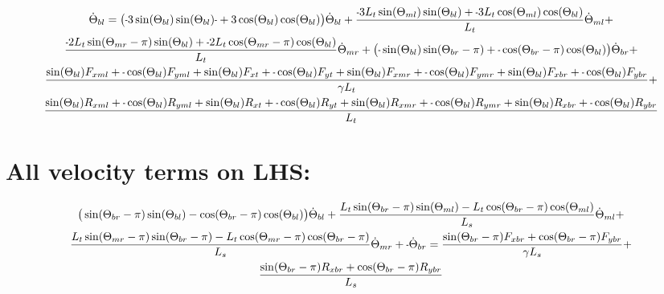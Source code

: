 \documentclass[11pt, landscape]{article}
\newcommand{\mn}{\scalebox{0.7}[1.0]{-}}
\begin{document}
\begin{multline}
\dot{\Theta}_{bl} =
\big(\mn 3\sin(\Theta_{bl})\sin(\Theta_{bl})\mn + 3\cos(\Theta_{bl})\cos(\Theta_{bl}) \big)\dot{\Theta}_{bl} +
\frac{\mn 3L_{t}\sin(\Theta_{ml})\sin(\Theta_{bl}) + \mn 3L_{t}\cos(\Theta_{ml})\cos(\Theta_{bl})}{L_t}\dot{\Theta}_{ml} + \\
\frac{\mn 2L_{t}\sin(\Theta_{mr}-\pi)\sin(\Theta_{bl}) + \mn 2L_{t}\cos(\Theta_{mr}-\pi)\cos(\Theta_{bl})}{L_t}\dot{\Theta}_{mr} +
\big(\mn \sin(\Theta_{bl}) \sin(\Theta_{br}-\pi) + \mn \cos(\Theta_{br}-\pi)\cos(\Theta_{bl})\big) \dot{\Theta}_{br} + \\
\frac{\sin(\Theta_{bl})F_{xml} + \mn\cos(\Theta_{bl})F_{yml} + \sin(\Theta_{bl})F_{xt } + \mn \cos(\Theta_{bl})F_{yt } + \sin(\Theta_{bl})F_{xmr} + \mn \cos(\Theta_{bl})F_{ymr} + \sin(\Theta_{bl})F_{xbr} + \mn \cos(\Theta_{bl})F_{ybr}}{\gamma L_t} + \\
\frac{\sin(\Theta_{bl})R_{xml} + \mn \cos(\Theta_{bl})R_{yml} + \sin(\Theta_{bl})R_{xt } + \mn \cos(\Theta_{bl})R_{yt} + \sin(\Theta_{bl})R_{xmr} + \mn \cos(\Theta_{bl})R_{ymr} + \sin(\Theta_{bl})R_{xbr} + \mn \cos(\Theta_{bl})R_{ybr}}{L_t}
\end{multline}

\section{All velocity terms on LHS:}

\begin{multline}
\big(\sin(\Theta_{br}-\pi)\sin(\Theta_{bl}) - \cos(\Theta_{br}-\pi)\cos(\Theta_{bl})\big)\dot{\Theta}_{bl} + 
\frac{L_{t}\sin(\Theta_{br}-\pi)\sin(\Theta_{ml}) - L_{t}\cos(\Theta_{br}-\pi)\cos(\Theta_{ml})}{L_{s}}\dot{\Theta}_{ml}  + \\
\frac{L_{t}\sin(\Theta_{mr}-\pi)\sin(\Theta_{br}-\pi) - L_{t}\cos(\Theta_{mr}-\pi)\cos(\Theta_{br}-\pi)}{L_{s}}\dot{\Theta}_{mr} +
\mn\dot{\Theta}_{br} =
\frac{\sin(\Theta_{br}-\pi)F_{xbr} + \cos(\Theta_{br}-\pi)F_{ybr}}{\gamma L_{s}} + \\
\frac{\sin(\Theta_{br}-\pi)R_{xbr} + \cos(\Theta_{br}-\pi)R_{ybr}}{L_{s}}
\end{multline}
\end{document}
